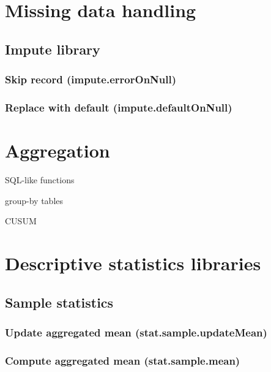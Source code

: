 \documentclass{article}
\theoremstyle{definition}
\begin{document}
\pagebreak

\section{Missing data handling}

\subsection{Impute library}

\subsubsection{Skip record (impute.errorOnNull)}

\subsubsection{Replace with default (impute.defaultOnNull)}

\pagebreak

\section{Aggregation}

SQL-like functions

group-by tables

CUSUM

\pagebreak

\section{Descriptive statistics libraries}

\subsection{Sample statistics}

\subsubsection{Update aggregated mean (stat.sample.updateMean)}

\subsubsection{Compute aggregated mean (stat.sample.mean)}
\end{document}
